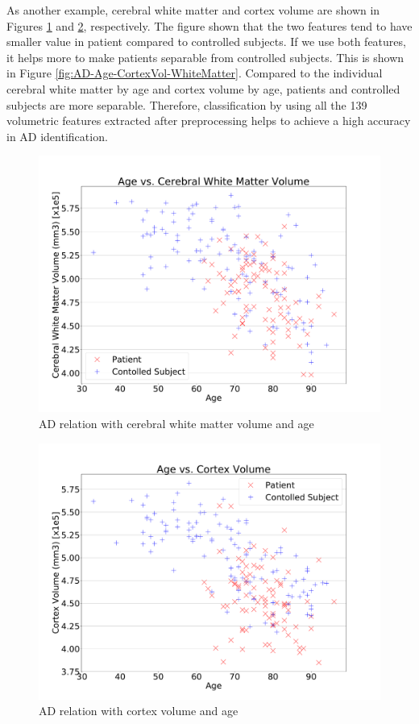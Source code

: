As another example, cerebral white matter and cortex volume are shown in Figures \ref{fig:AD-WhiteMatter} and \ref{fig:AD-CortexVol}, respectively. The figure shown that the two features tend to have smaller value in patient compared to controlled subjects. If we use both features, it helps more to make patients separable from controlled subjects. This is shown in Figure \ref{fig:AD-Age-CortexVol-WhiteMatter}. Compared to the individual cerebral white matter by age and cortex volume by age, patients and controlled subjects are more separable. Therefore, classification by using all the 139 volumetric features extracted after preprocessing helps to achieve a high accuracy in AD identification.

\begin{figure}
	\centering
	\includegraphics[width=\columnwidth]{images/AD-Age-WhiteMatter.pdf}
	\caption{AD relation with cerebral white matter volume and age}
	\label{fig:AD-WhiteMatter}
\end{figure} 

\begin{figure}
	\centering
	\includegraphics[width=\columnwidth]{images/AD-Age-CortexVol.pdf}
	\caption{AD relation with cortex volume and age}
	\label{fig:AD-CortexVol}
\end{figure}



